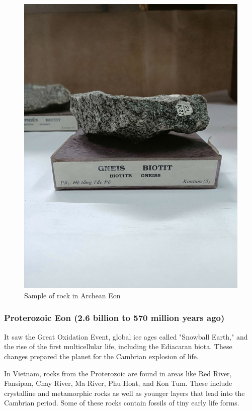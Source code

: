 \begin{figure}[H]
  \centering
  \includegraphics[max width=0.8\linewidth]{graphics/figure_02.jpg}
  \caption{Sample of rock in Archean Eon}
  \label{fig:archean-rock}
\end{figure}

\subsubsection{Proterozoic Eon (2.6 billion to 570 million years ago)}
\label{subsubsec:proterozoic}

It saw the Great Oxidation Event, global ice ages called "Snowball Earth," and the rise of the first multicellular life, including the Ediacaran biota. These changes prepared the planet for the Cambrian explosion of life.

In Vietnam, rocks from the Proterozoic are found in areas like Red River, Fansipan, Chay River, Ma River, Phu Hoat, and Kon Tum. These include crystalline and metamorphic rocks as well as younger layers that lead into the Cambrian period. Some of these rocks contain fossils of tiny early life forms.

